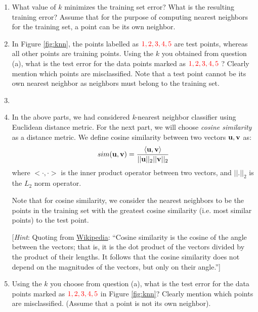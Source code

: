 \documentclass[11pt]{article}
\begin{document}
\begin{enumerate}
\item {} What value of $k$ minimizes the training set error? What is the resulting training error? Assume that for the purpose of computing nearest neighbors for the training set, a point can be its own neighbor. \vspace{2cm}


\item {} In Figure \ref{fig:knn}, the points labelled as  ${\color{red}1, 2, 3, 4, 5}$ are test points, whereas all other points are training points.  Using the $k$ you obtained from question (a), what is the test error for the data points marked as ${\color{red}1, 2, 3, 4, 5}$ ? Clearly mention which points are misclassified. Note that a test point cannot be its own nearest neighbor as neighbors must belong to the training set. \newpage

\item[]

\item[] In the above parts, we had considered \textit{k}-nearest neighbor classifier using Euclidean distance metric. For the next part, we will choose \textit{cosine similarity} as a distance metric. We define cosine similarity between two vectors ${\mathbf u}, {\mathbf v}$ as:
$$sim({\mathbf u}, {\mathbf v})  = \frac{ \langle {\mathbf u} , {\mathbf v} \rangle}{||{\mathbf u}||_{2}||{\mathbf v}||_{2}}$$
where $<\cdot,\cdot>$ is the inner product operator between two vectors, and $||.||_{2}$ is the $L_{2}$ norm operator. 

Note that for cosine similarity, we consider the nearest neighbors to be the points in the training set with the greatest cosine similarity (i.e. most similar points) to the test point.

[\emph{Hint}: Quoting from \href{https://en.wikipedia.org/wiki/Cosine_similarity}{Wikipedia}: ``Cosine similarity is the cosine of the angle between the vectors; that is, it is the dot product of the vectors divided by the product of their lengths. It follows that the cosine similarity does not depend on the magnitudes of the vectors, but only on their angle.'']

\item {} Using the $k$ you choose from question (a), what is the test error for the data points marked as ${\color{red}1, 2, 3, 4, 5}$ in Figure \ref{fig:knn}? Clearly mention which points are misclassified. (Assume that a point is not its own neighbor). 

\end{enumerate}
\end{document}
